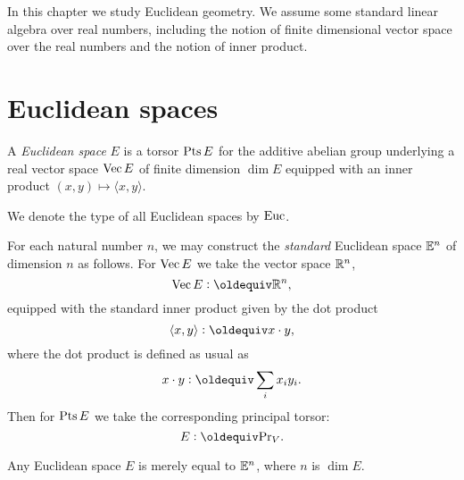 

In this chapter we study Euclidean geometry.  We assume some standard linear
algebra over real numbers, including the notion of finite dimensional vector
space over the real numbers and the notion of inner product.

\section{Euclidean spaces}

\begin{definition}\label{def:EuclideanSpace}
  A {\em Euclidean space} $E$ is a torsor $\operatorname{Pts} E$ for the additive abelian group underlying
  a real vector space $\operatorname{Vec} E$ of finite dimension $\dim E$ equipped with an inner product
  $(x,y) \mapsto \langle x,y \rangle$.
\end{definition}

We denote the type of all Euclidean spaces by $\mathrm{Euc}$.

For each natural number $n$, we may construct the {\em standard} Euclidean
space $\mathbb E^n$ of dimension $n$ as follows.  For $\operatorname{Vec} E$ we take the vector space $\mathbb{R}^n$,
$$ \Vectors E \defeq \RR^n, $$
equipped with the standard inner product given by the dot product
$$ \langle x , y \rangle \defeq x \cdot y, $$
where the dot product is defined as usual as
$$ x \cdot y \defeq \sum_i x_i y_i . $$
Then for $\operatorname{Pts} E$ we take the corresponding principal torsor:
$$ E \defeq \princ V. $$

\begin{theorem}\label{thm:GramSchmidt}
  Any Euclidean space $E$ is merely equal to $\mathbb E^n$, where $n$ is $\dim E$.
\end{theorem}

